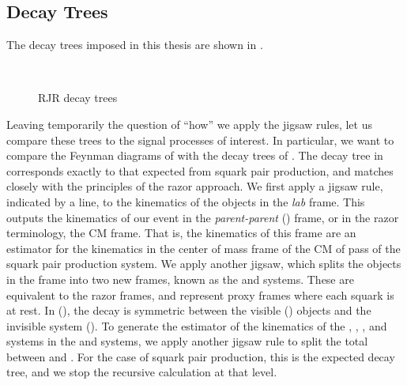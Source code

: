 \subsection{Decay Trees}

The decay trees imposed in this thesis are shown in .
\begin{figure}[tbp]
\caption{RJR decay trees} \label{fig:decay_trees}
 \\
\end{figure}
Leaving temporarily the question of ``how'' we apply the jigsaw rules, let us compare these trees to the signal processes of interest.
In particular, we want to compare the Feynman diagrams of  with the decay trees of .
The decay tree in  corresponds exactly to that expected from squark pair production, and matches closely with the principles of the razor approach.
We first apply a jigsaw rule, indicated by a line, to the kinematics of the objects in the \textit{lab} frame.
This outputs the kinematics of our event in the \textit{parent-parent} (\PP) frame, or in the razor terminology, the CM frame.
That is, the kinematics of this frame are an estimator for the kinematics in the center of mass frame of the CM of pass of the squark pair production system.
We apply another jigsaw, which splits the objects in the \PP frame into two new frames, known as the \Pa and \Pb systems.
These are equivalent to the razor frames, and represent proxy frames where each squark is at rest.
In \Pa (\Pb), the decay is symmetric between the visible \Va (\Vb) objects and the invisible system \Ia (\Ib).
To generate the estimator of the kinematics of the \Va, \Vb, \Ia, and \Ib systems in the \Pa and \Pb systems, we apply another jigsaw rule to split the total \met between \Pa and \Pb.
For the case of squark pair production, this is the expected decay tree, and we stop the recursive calculation at that level.

